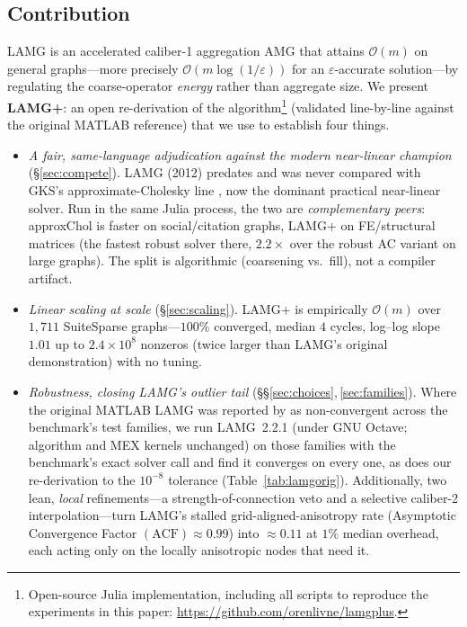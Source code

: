 \documentclass[leqno,letterpaper]{etna}
\newcommand{\Om}{\mathcal{O}(m)}
\newcommand{\acf}{\mathrm{ACF}}
\begin{document}
\subsection{Contribution}\label{sec:contrib}
LAMG \cite{lamg} is an accelerated caliber-1 aggregation AMG that attains $\Om$ on general
graphs---more precisely $\mathcal{O}(m\log(1/\varepsilon))$ for an $\varepsilon$-accurate
solution---by regulating the coarse-operator \emph{energy} rather than aggregate size. We present
\textbf{LAMG+}: an open re-derivation of the algorithm\footnote{Open-source Julia implementation,
including all scripts to reproduce the experiments in this paper: \url{https://github.com/orenlivne/lamgplus}.}
(validated line-by-line against the
original MATLAB reference) that we use to establish four things.
\begin{itemize}[leftmargin=1.4em,itemsep=1pt]
\item \emph{A fair, same-language adjudication against the modern near-linear champion}
(\S\ref{sec:compete}). LAMG (2012) predates and was never compared with GKS's approxi\-mate-Cholesky
line \cite{laplacians,gks2023}, now the dominant practical near-linear solver.
Run in the same Julia process, the two are \emph{complementary peers}: approxChol is
faster on social/citation graphs, LAMG+ on FE/structural matrices (the fastest robust solver there,
$2.2\times$ over the robust AC variant on large graphs). The split is algorithmic
(coarsening vs.\ fill), not a compiler artifact.
\item \emph{Linear scaling at scale} (\S\ref{sec:scaling}). LAMG+ is empirically $\Om$ over
$1{,}711$ SuiteSparse graphs---$100\%$ converged, median $4$ cycles, log--log slope $1.01$ up to $2.4\!\times\!10^8$ nonzeros (twice larger than LAMG's original demonstration) with no tuning.
\item \emph{Robustness, closing LAMG's outlier tail} (\S\S\ref{sec:choices},\,\ref{sec:families}).
Where the original MATLAB LAMG was reported by \cite{gks2023} as non-convergent across the benchmark's
test families, we run LAMG~2.2.1 (under GNU Octave; algorithm and MEX kernels unchanged) on those
families with the benchmark's exact solver call and find it converges on every one, as does our
re-derivation to the $10^{-8}$ tolerance (Table~\ref{tab:lamgorig}).
Additionally, two lean, \emph{local} refinements---a strength-of-connection veto and a selective caliber-2
interpolation---turn LAMG's stalled
grid-aligned-anisotropy rate (Asymptotic Convergence Factor $(\acf)\approx0.99$) into $\approx0.11$ at $\!1\%$ median
overhead, each acting only on the locally anisotropic nodes that need it. 

\end{itemize}
\end{document}
